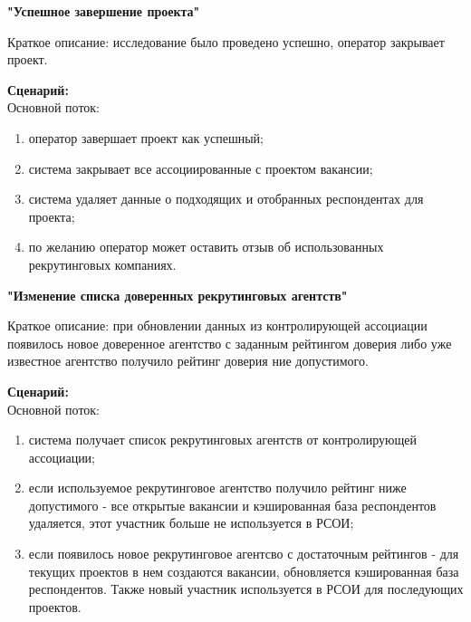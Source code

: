\textbf{"Успешное завершение проекта"}

Краткое описание: исследование было проведено успешно, оператор закрывает проект.

\textbf{Сценарий:}\\
Основной поток:
\begin{enumerate}
\item оператор завершает проект как успешный;
\item система закрывает все ассоциированные с проектом вакансии;
\item система удаляет данные о подходящих и отобранных респондентах для проекта;
\item по желанию оператор может оставить отзыв об использованных рекрутинговых компаниях.
\end{enumerate}

\textbf{"Изменение списка доверенных рекрутинговых агентств"}

Краткое описание: при обновлении данных из контролирующей ассоциации появилось новое доверенное агентство с заданным рейтингом доверия либо уже известное агентство получило рейтинг доверия ние допустимого.

\textbf{Сценарий:}\\
Основной поток:
\begin{enumerate}
\item система получает список рекрутинговых агентств от контролирующей ассоциации;
\item если используемое рекрутинговое агентство получило рейтинг ниже допустимого - все открытые вакансии и кэшированная база респондентов удаляется, этот участник больше не используется в РСОИ;
\item если появилось новое рекрутинговое агентсво с достаточным рейтингов - для текущих проектов в нем создаются вакансии, обновляется кэшированная база респондентов. Также новый участник используется в РСОИ для последующих проектов.
\end{enumerate}

